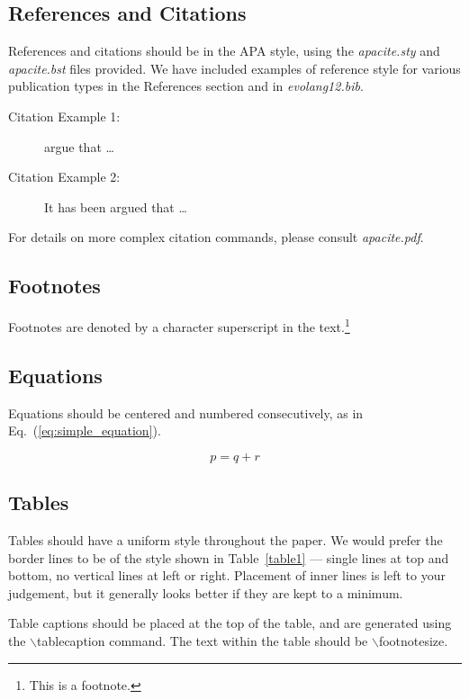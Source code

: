 \documentclass{evolang}
\begin{document}
\subsection{References and Citations}

References and citations should be in the APA style, using the {\em  apacite.sty} and {\em apacite.bst} files provided.  We have included examples of reference style for various publication types in the References section and in {\em evolang12.bib}.

\begin{description}
\item [Citation Example 1:]  argue that \ldots
\item [Citation Example 2:] It has been argued \cite{pinker_90_natural} that \ldots
\end{description}
\nocite{tomasello_03_constructing,hauser_03_uniquely}

For details on more complex citation commands, please consult {\em apacite.pdf}.

\subsection{Footnotes}

Footnotes are denoted by a character superscript in the
text.\footnote{This is a footnote.}

\subsection{Equations}

Equations should be centered and numbered consecutively, as in
Eq.~(\ref{eq:simple_equation}).

\begin{equation}
p = q + r
\label{eq:simple_equation}
\end{equation}

\subsection{Tables}

Tables should have a uniform style throughout the paper.  We would
prefer the border lines to be of the style shown in Table~\ref{table1}
--- single lines at top and bottom, no vertical lines at left or
right.  Placement of inner lines is left to your judgement, but it
generally looks better if they are kept to a minimum.

Table captions should be placed at the top of the table, and are
generated using the $\backslash$tablecaption command.  The text within
the table should be $\backslash$footnotesize.
\end{document}
